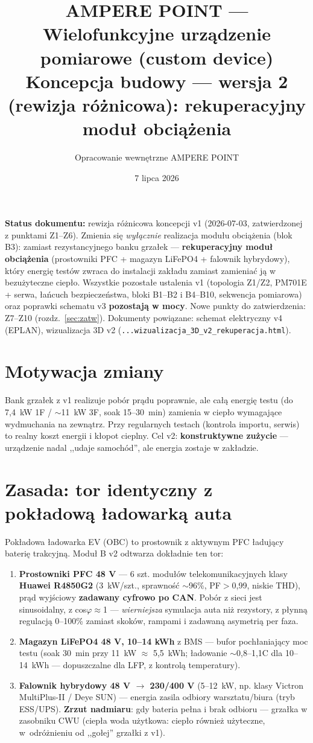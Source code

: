 \documentclass[11pt,a4paper]{article}
\title{\textbf{AMPERE POINT --- Wielofunkcyjne urządzenie pomiarowe (custom device)}\\[4pt]
\large Koncepcja budowy --- wersja 2 (rewizja różnicowa): rekuperacyjny moduł obciążenia}
\author{Opracowanie wewnętrzne AMPERE POINT}
\date{7 lipca 2026}
\begin{document}
\maketitle
\vspace{-1.5em}

\noindent\textbf{Status dokumentu:} rewizja różnicowa koncepcji v1 (2026-07-03, zatwierdzonej z punktami Z1--Z6).
Zmienia się \emph{wyłącznie} realizacja modułu obciążenia (blok B3): zamiast rezystancyjnego banku grzałek ---
\textbf{rekuperacyjny moduł obciążenia} (prostowniki PFC + magazyn LiFePO4 + falownik hybrydowy), który energię
testów zwraca do instalacji zakładu zamiast zamieniać ją w bezużyteczne ciepło. Wszystkie pozostałe ustalenia v1
(topologia Z1/Z2, PM701E + serwa, łańcuch bezpieczeństwa, bloki B1--B2 i B4--B10, sekwencja pomiarowa) oraz
poprawki schematu v3 \textbf{pozostają w mocy}. Nowe punkty do zatwierdzenia: Z7--Z10 (rozdz.~\ref{sec:zatw}).
Dokumenty powiązane: schemat elektryczny v4 (EPLAN), wizualizacja 3D v2 (\texttt{...wizualizacja\_3D\_v2\_rekuperacja.html}).

\tableofcontents

\section{Motywacja zmiany}
Bank grzałek z v1 realizuje pobór prądu poprawnie, ale całą energię testu (do 7,4~kW 1F / $\sim$11~kW 3F,
soak 15--30~min) zamienia w ciepło wymagające wydmuchania na zewnątrz. Przy regularnych testach (kontrola importu,
serwis) to realny koszt energii i kłopot cieplny. Cel v2: \textbf{konstruktywne zużycie} --- urządzenie nadal
,,udaje samochód'', ale energia zostaje w zakładzie.

\section{Zasada: tor identyczny z pokładową ładowarką auta}
Pokładowa ładowarka EV (OBC) to prostownik z aktywnym PFC ładujący baterię trakcyjną. Moduł B v2 odtwarza
dokładnie ten tor:
\begin{enumerate}
\item \textbf{Prostowniki PFC 48 V} --- 6 szt. modułów telekomunikacyjnych klasy \textbf{Huawei R4850G2}
(3~kW/szt., sprawność $\sim$96\%, PF$>$0,99, niskie THD), prąd wyjściowy \textbf{zadawany cyfrowo po CAN}.
Pobór z sieci jest sinusoidalny, z cos$\varphi\approx$1 --- \emph{wierniejsza} symulacja auta niż rezystory,
z płynną regulacją 0--100\% zamiast skoków, rampami i zadawaną asymetrią per faza.
\item \textbf{Magazyn LiFePO4 48 V, 10--14 kWh} z BMS --- bufor pochłaniający moc testu
(soak 30~min przy 11~kW $\approx$ 5,5~kWh; ładowanie $\sim$0,8--1,1C dla 10--14~kWh --- dopuszczalne dla LFP,
z kontrolą temperatury).
\item \textbf{Falownik hybrydowy 48 V $\rightarrow$ 230/400 V} (5--12~kW, np. klasy Victron MultiPlus-II /
Deye SUN) --- energia zasila odbiory warsztatu/biura (tryb ESS/UPS). \textbf{Zrzut nadmiaru}: gdy bateria pełna
i brak odbioru --- grzałka w zasobniku CWU (ciepła woda użytkowa: ciepło również użyteczne, w~odróżnieniu od
,,gołej'' grzałki z v1).
\end{enumerate}
\end{document}

